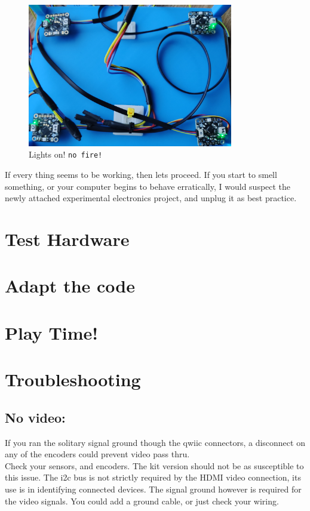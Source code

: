 \documentclass[]{article}
\begin{document}
\begin{figure}[ht]
	\centering
	\includegraphics[width=0.8\textwidth]{noFire.png}
	\caption{Lights on! \texttt{no fire!} }
	\label{fig:looks_good}
\end{figure}

If every thing seems to be working, then lets proceed. 
If you start to smell something, or your computer begins to behave erratically, I would suspect the newly attached experimental electronics project, and unplug it as best practice. 
 

\section*{Test Hardware}

\section*{Adapt the code}

\section*{Play Time!}

\section*{Troubleshooting}
\subsection{No video:} If you ran the solitary signal ground though the qwiic connectors, a disconnect on any of the encoders could prevent video pass thru.\\Check your sensors, and encoders. The kit version should not be as susceptible to this issue.
The i2c bus is not strictly required by the HDMI video connection, its use is in identifying connected devices. The signal ground however is required for the video signals. You could add a ground cable, or just check your wiring. 
\end{document}
